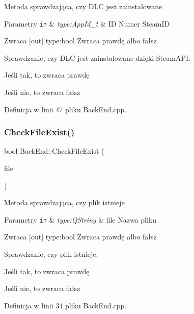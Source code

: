 Metoda sprawdzająca, czy D\+LC jest zainstalowane 
\begin{DoxyParams}[1]{Parametry}
\mbox{\tt in}  & {\em type\+:\+App\+Id\+\_\+t} & ID Numer Steam\+ID \\
\hline
\end{DoxyParams}
\begin{DoxyReturn}{Zwraca}
\mbox{[}out\mbox{]} type\+:bool Zwraca prawdę albo fałsz 
\end{DoxyReturn}
Sprawdzanie, czy D\+LC jest zainstalowane dzięki Steam\+A\+PI.

Jeśli tak, to zwraca prawdę

Jeśli nie, to zwraca fałsz 

Definicja w linii 47 pliku Back\+End.\+cpp.

\mbox{\label{class_back_end_space_1_1_back_end_ab7c89f258fb3afaa6b2ef9d16b009560}} 
\subsubsection{\texorpdfstring{Check\+File\+Exist()}{CheckFileExist()}}
{\footnotesize\ttfamily bool Back\+End\+::\+Check\+File\+Exist (\begin{DoxyParamCaption}\item[{Q\+String}]{file }\end{DoxyParamCaption})}

Metoda sprawdzająca, czy plik istnieje 
\begin{DoxyParams}[1]{Parametry}
\mbox{\tt in}  & {\em type\+:\+Q\+String} & file Nazwa pliku \\
\hline
\end{DoxyParams}
\begin{DoxyReturn}{Zwraca}
\mbox{[}out\mbox{]} type\+:bool Zwraca prawdę albo fałsz 
\end{DoxyReturn}
Sprawdzanie, czy plik istnieje.

Jeśli tak, to zwraca prawdę

Jeśli nie, to zwraca fałsz 

Definicja w linii 34 pliku Back\+End.\+cpp.

\mbox{\label{class_back_end_space_1_1_back_end_a04f69b715de1c65b21873a46b70fcc27}} 
